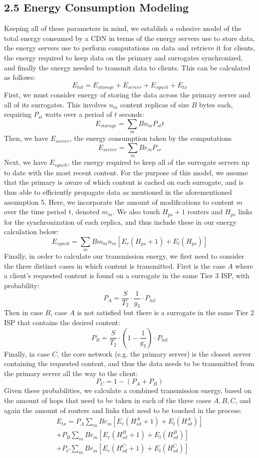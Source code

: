 \documentclass[
	a4paper, %
	10pt, %
	unnumberedsections, %
	twoside, %
]{LTJournalArticle}
\begin{document}
\subsection{2.5  Energy Consumption Modeling}
Keeping all of these parameters in mind, we establish a cohesive model of the total energy consumed by a CDN in terms of the energy servers use to store data, the energy servers use to perform computations on data and retrieve it for clients, the energy required to keep data on the primary and surrogates synchronized, and finally the energy needed to transmit data to clients. This can be calculated as follows:
\[E_{tot} = E_{storage} + E_{server} + E_{synch} + E_{tx}\]
First, we must consider energy of storing the data across the primary server and all of its surrogates. This involves $n_m$ content replicas of size $B$ bytes each, requiring $P_{st}$ watts over a period of $t$ seconds:
\[E_{storage} = \sum_mBn_mP_{st}t\]
Then, we have $E_{server}$, the energy consumption taken by the computations 
\[E_{server} = \sum_mBr_mP_{sr}\]
Next, we have $E_{synch}$, the energy required to keep all of the surrogate servers up to date with the most recent content. For the purpose of this model, we assume that the primary is aware of which content is cached on each surrogate, and is thus able to efficiently propagate data as mentioned in the aforementioned assumption 5. Here, we incorporate the amount of modifications to content $m$ over the time period $t$, denoted $m_m$. We also touch $H_{ps} + 1$ routers and $H_{ps}$ links for the synchronization of each replica, and thus include these in our energy calculation below:
\[E_{synch} = \sum_mBm_mn_m[E_r(H_{ps} + 1) + E_l(H_{ps})]\]
Finally, in order to calculate our transmission energy, we first need to consider the three distinct cases in which content is transmitted. First is the case $A$ where a client's requested content is found on a surrogate in the same Tier 3 ISP, with probability:
\[P_A = \frac{S}{T_2} \cdot \frac{1}{g_3} \cdot P_{hit}\]
Then in case $B$, case $A$ is not satisfied but there is a surrogate in the same Tier 2 ISP that contains the desired content:
\[P_B = \frac{S}{T_2} \cdot \left(1 - \frac{1}{g_3}\right) \cdot P_{hit}\]
Finally, in case $C$, the core network (e.g. the primary server) is the closest server containing the requested content, and thus the data needs to be transmitted from the primary server all the way to the client:
\[P_C = 1 - (P_A + P_B)\]
Given these probabilities, we calculate a combined transmission energy, based on the amount of hops that need to be taken in each of the three cases $A, B, C$, and again the amount of routers and links that need to be touched in the process:
\begin{multline*}
    E_{tx} = P_A\sum_mBr_m[E_r(H^A_{sd} + 1) + E_l(H^A_{sd})] \\
      + P_B\sum_mBr_m[E_r(H^B_{sd} + 1) + E_l(H^B_{sd})] \\
      + P_C\sum_mBr_m[E_r(H^C_{sd} + 1) + E_l(H^C_{sd})] \\
\end{multline*}
\end{document}
